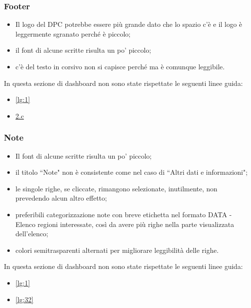 \subsubsection{Footer}
\label{sss:footer}
\begin{itemize}
    \item Il logo del DPC potrebbe essere più grande dato che lo spazio c'è e il logo è leggermente sgranato perché è piccolo;
    \item il font di alcune scritte risulta un po' piccolo;
    \item c'è del testo in corsivo non si capisce perché ma è comunque leggibile.
\end{itemize}
In questa sezione di dashboard non sono state rispettate le seguenti linee guida:
\begin{itemize}
    \item \ref{lg:1}
    \item \hyperref[lg:2.c]{2.c}
\end{itemize}

\subsubsection{Note}
\label{sss:note}
\begin{itemize}
    \item Il font di alcune scritte risulta un po' piccolo;
    \item il titolo ``Note" non è consistente come nel caso di ``Altri dati e informazioni";
    \item le singole righe, se cliccate, rimangono selezionate, inutilmente, non prevedendo alcun altro effetto;
    \item preferibili categorizzazione note con breve etichetta nel formato DATA - Elenco regioni interessate, così da avere più righe nella parte visualizzata dell'elenco;
    \item colori semitrasparenti alternati per migliorare leggibilità delle righe.
\end{itemize}
In questa sezione di dashboard non sono state rispettate le seguenti linee guida:
\begin{itemize}
    \item \ref{lg:1}
    \item \ref{lg:32}
\end{itemize}

